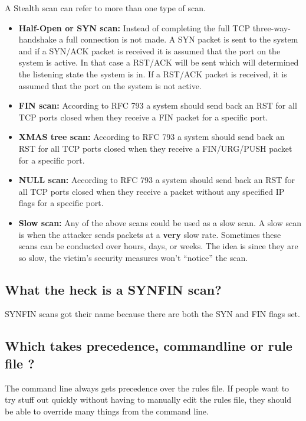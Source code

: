 \documentclass{article}
\begin{document}
A Stealth scan can refer to more than one type of scan.
\begin{itemize}
  \item {\bf Half-Open or SYN scan:} Instead of completing the full TCP
    three-way-handshake a full connection is not made. A SYN packet is sent to
    the system and if a SYN/ACK packet is received it is assumed that the port
    on the system is active. In that case a RST/ACK will be sent which will
    determined the listening state the system is in. If a RST/ACK packet is
    received, it is assumed that the port on the system is not active.
  \item {\bf FIN scan:} According to RFC 793 a system should send back an RST for all TCP
    ports closed when they receive a FIN packet for a specific port.
  \item {\bf XMAS tree scan:} According to RFC 793 a system should send back an RST for
    all TCP ports closed when they receive a FIN/URG/PUSH packet for a specific
    port.
  \item {\bf NULL scan:} According to RFC 793 a system should send back an RST for all TCP
    ports closed when they receive a packet without any specified IP flags for
    a specific port.
  \item {\bf Slow scan:} Any of the above scans could be used as a slow scan. A slow scan
    is when the attacker sends packets at a {\bf very} slow rate. Sometimes these
    scans can be conducted over hours, days, or weeks. The idea is since they
    are so slow, the victim's security measures won't ``notice'' the scan.
\end{itemize}

\subsection{What the heck is a SYNFIN scan?}

SYNFIN scans got their name because there are both the SYN and FIN flags set.

\subsection{Which takes precedence, commandline or rule file ?}

The command line always gets precedence over the rules file.  If people
want to try stuff out quickly without having to manually edit the rules
file, they should be able to override many things from the command
line.  
\end{document}
